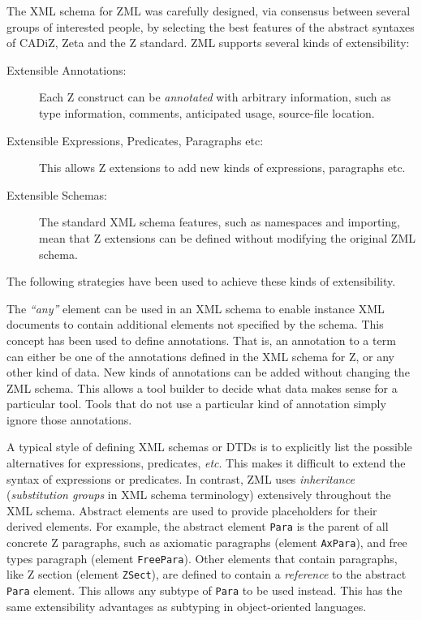 \documentclass{llncs}
\newcommand{\Element}[1]{\texttt{#1}}
\begin{document}
  The XML schema for ZML was carefully designed, via consensus between
  several groups of interested people, by selecting the best features
  of the abstract syntaxes of CADiZ, Zeta and the Z standard.
  ZML supports several kinds of extensibility:
  \begin{description}
  \item[Extensible Annotations:] Each Z construct can be \emph{annotated}
    with arbitrary information, such as type information, comments,
    anticipated usage, source-file location.
  \item[Extensible Expressions, Predicates, Paragraphs etc:] This
    allows Z extensions to add new kinds of expressions, paragraphs etc.
  \item[Extensible Schemas:] The standard XML schema features, such as
    namespaces and importing, mean that Z extensions can be defined without
    modifying the original ZML schema.
  \end{description}
  The following strategies have been used to achieve these kinds
  of extensibility.

  The \textit{``any''} element can be used in an XML schema to enable
  instance XML documents to contain additional elements not specified
  by the schema.  This concept has been used to define annotations.
  That is, an annotation to a term can either be one of the
  annotations defined in the XML schema for Z, or any other kind of
  data.  New kinds of annotations can be added without changing the ZML
  schema.  This allows a tool builder to decide what data makes sense
  for a particular tool.  Tools that do not use a particular kind
  of annotation simply ignore those annotations.

  A typical style of defining XML schemas or DTDs is to explicitly
  list the possible alternatives for expressions, predicates, \textit{etc}.
  This makes it difficult to extend the syntax of expressions or
  predicates.  In contrast, ZML uses \emph{inheritance}
  (\emph{substitution groups} in XML schema terminology) extensively
  throughout the XML schema.  Abstract elements are used to provide
  placeholders for their derived elements.  For example, the abstract
  element \Element{Para} is the parent of all concrete Z paragraphs,
  such as axiomatic paragraphs (element \Element{AxPara}), and free
  types paragraph (element \Element{FreePara}).  Other elements that
  contain paragraphs, like Z section (element \Element{ZSect}), are
  defined to contain a \emph{reference} to the abstract \Element{Para}
  element.  This allows any subtype of \Element{Para} to be used
  instead.  This has the same extensibility advantages as subtyping
  in object-oriented languages.
\end{document}
